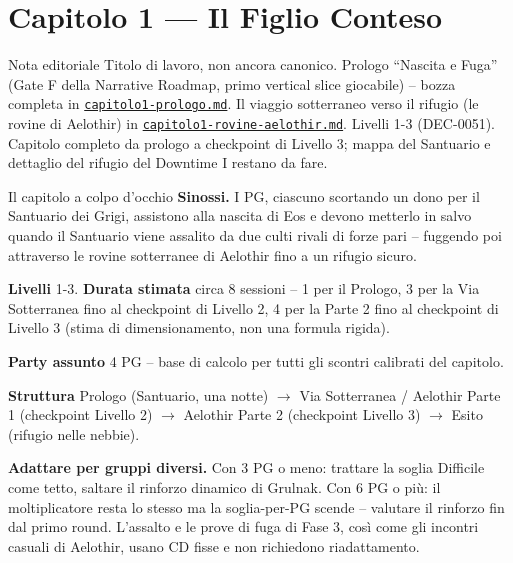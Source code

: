 \chapter*{Capitolo 1 --- Il Figlio Conteso}
\label{chap:capitolo1}

\begin{DndComment}[]{Nota editoriale}
  Titolo di lavoro, non ancora canonico. Prologo ``Nascita e Fuga'' (Gate F della Narrative Roadmap, primo vertical slice giocabile) -- bozza completa in \href{https://github.com/fpetrulio/child-of-balance/blob/main/docs/01-campaign-design/capitolo1-prologo.md}{\texttt{capitolo1-prologo.md}}. Il viaggio sotterraneo verso il rifugio (le rovine di Aelothir) in \href{https://github.com/fpetrulio/child-of-balance/blob/main/docs/01-campaign-design/capitolo1-rovine-aelothir.md}{\texttt{capitolo1-rovine-aelothir.md}}. Livelli 1-3 (DEC-0051). Capitolo completo da prologo a checkpoint di Livello 3; mappa del Santuario e dettaglio del rifugio del Downtime I restano da fare.
\end{DndComment}

\begin{DndSidebar}[]{Il capitolo a colpo d'occhio}
  \textbf{Sinossi.} I PG, ciascuno scortando un dono per il Santuario dei Grigi, assistono alla nascita di Eos e devono metterlo in salvo quando il Santuario viene assalito da due culti rivali di forze pari -- fuggendo poi attraverso le rovine sotterranee di Aelothir fino a un rifugio sicuro.

  \textbf{Livelli} 1-3. \textbf{Durata stimata} circa 8 sessioni -- 1 per il Prologo, 3 per la Via Sotterranea fino al checkpoint di Livello 2, 4 per la Parte 2 fino al checkpoint di Livello 3 (stima di dimensionamento, non una formula rigida).

  \textbf{Party assunto} 4 PG -- base di calcolo per tutti gli scontri calibrati del capitolo.

  \textbf{Struttura} Prologo (Santuario, una notte) $\to$ Via Sotterranea / Aelothir Parte 1 (checkpoint Livello 2) $\to$ Aelothir Parte 2 (checkpoint Livello 3) $\to$ Esito (rifugio nelle nebbie).

  \textbf{Adattare per gruppi diversi.} Con 3 PG o meno: trattare la soglia Difficile come tetto, saltare il rinforzo dinamico di Grulnak. Con 6 PG o più: il moltiplicatore resta lo stesso ma la soglia-per-PG scende -- valutare il rinforzo fin dal primo round. L'assalto e le prove di fuga di Fase 3, così come gli incontri casuali di Aelothir, usano CD fisse e non richiedono riadattamento.
\end{DndSidebar}

